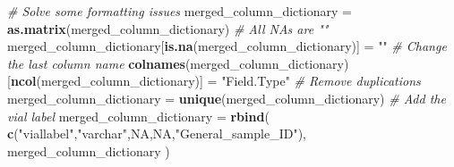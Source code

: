 \documentclass[]{article}
\newenvironment{Shaded}{\begin{snugshade}}{\end{snugshade}}
\newcommand{\KeywordTok}[1]{\textcolor[rgb]{0.13,0.29,0.53}{\textbf{#1}}}
\newcommand{\StringTok}[1]{\textcolor[rgb]{0.31,0.60,0.02}{#1}}
\newcommand{\CommentTok}[1]{\textcolor[rgb]{0.56,0.35,0.01}{\textit{#1}}}
\newcommand{\OtherTok}[1]{\textcolor[rgb]{0.56,0.35,0.01}{#1}}
\newcommand{\NormalTok}[1]{#1}
\begin{document}
\begin{Shaded}
\begin{Highlighting}[]
\CommentTok{# Solve some formatting issues}
\NormalTok{merged_column_dictionary =}\StringTok{ }\KeywordTok{as.matrix}\NormalTok{(merged_column_dictionary)}
\CommentTok{# All NAs are ""}
\NormalTok{merged_column_dictionary[}\KeywordTok{is.na}\NormalTok{(merged_column_dictionary)] =}\StringTok{ ""}
\CommentTok{# Change the last column name}
\KeywordTok{colnames}\NormalTok{(merged_column_dictionary)[}\KeywordTok{ncol}\NormalTok{(merged_column_dictionary)] =}\StringTok{ "Field.Type"}
\CommentTok{# Remove duplications}
\NormalTok{merged_column_dictionary =}\StringTok{ }\KeywordTok{unique}\NormalTok{(merged_column_dictionary)}
\CommentTok{# Add the vial label}
\NormalTok{merged_column_dictionary =}\StringTok{ }\KeywordTok{rbind}\NormalTok{(}
  \KeywordTok{c}\NormalTok{(}\StringTok{"viallabel"}\NormalTok{,}\StringTok{"varchar"}\NormalTok{,}\OtherTok{NA}\NormalTok{,}\OtherTok{NA}\NormalTok{,}\StringTok{"General_sample_ID"}\NormalTok{),}
\NormalTok{  merged_column_dictionary}
\NormalTok{)}


\end{Highlighting}
\end{Shaded}
\end{document}
